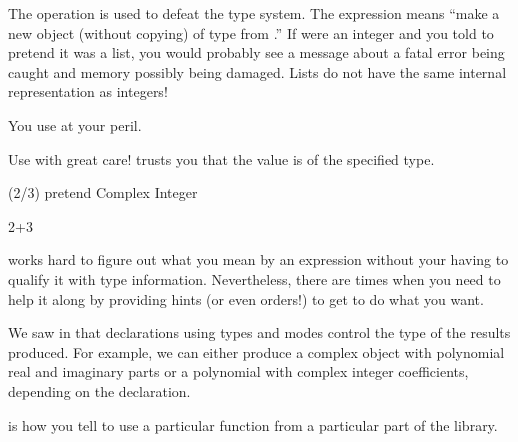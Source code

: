 The operation  is used to defeat the \Language{}
type system.
The expression  means ``make a new object
(without copying) of type  from .''
If  were an integer and you told \Language{}
to pretend it was a list, you would probably see a message about a
fatal error being caught and memory possibly being damaged.
Lists do not have the same internal representation as integers!

You use  at your peril.

\begin{xtc}
\begin{xtccomment}
Use  with great care!
\Language{} trusts you that the value is of the specified type.
\end{xtccomment}
\begin{spadsrc}
(2/3) pretend Complex Integer
\end{spadsrc}
\begin{TeXOutput}
\begin{fricasmath}{13}
2+3\TIMES \ImaginaryI %
\end{fricasmath}
\end{TeXOutput}
\end{xtc}


\Language{} works hard to figure out what you mean by an
expression without your having to qualify it with type
information.
Nevertheless, there are times when you need to help it along by
providing hints (or even orders!) to get \Language{} to do what
you want.

We saw in  that declarations using types
and modes control the type of the results produced.
For example, we can either produce a complex object with
polynomial real and imaginary parts or a polynomial with complex
integer coefficients, depending on the declaration.

 is how you tell
\Language{} to use a particular function from a particular part of
the library.


